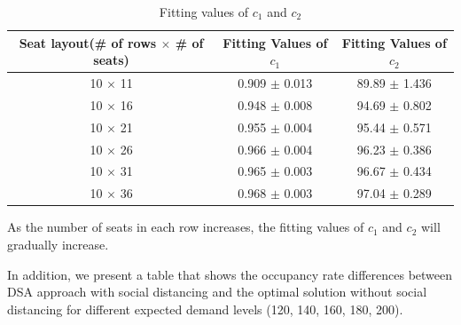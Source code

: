 \begin{table}[ht]
  \centering
  \caption{Fitting values of $c_1$ and $c_2$}
  \begin{tabular}{|c|c|c|}
  \hline
   Seat layout(\# of rows $\times$ \# of seats) & Fitting Values of $c_1$ & Fitting Values of $c_2$  \\
  \hline
   10 $\times$ 11 & 0.909 $\pm$ 0.013  & 89.89 $\pm$ 1.436 \\
   10 $\times$ 16 & 0.948 $\pm$ 0.008  & 94.69 $\pm$ 0.802 \\
   10 $\times$ 21 & 0.955 $\pm$ 0.004 & 95.44 $\pm$ 0.571 \\
   10 $\times$ 26 & 0.966 $\pm$ 0.004 & 96.23 $\pm$ 0.386 \\
   10 $\times$ 31 & 0.965 $\pm$ 0.003 & 96.67 $\pm$ 0.434 \\
   10 $\times$ 36 & 0.968 $\pm$ 0.003 & 97.04 $\pm$ 0.289 \\
   \hline
  \end{tabular}
\end{table}

As the number of seats in each row increases, the fitting values of $c_1$ and $c_2$ will gradually increase.

In addition, we present a table that shows the occupancy rate differences between DSA approach with social distancing and the optimal solution without social distancing for different expected demand levels (120, 140, 160, 180, 200).

